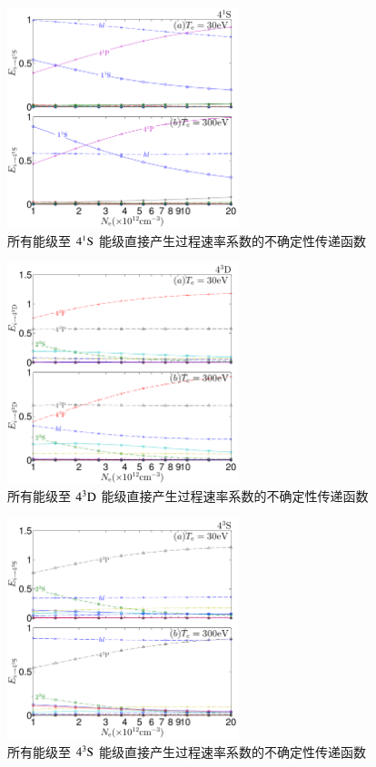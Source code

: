 \begin{figure}[H]
    \centering
    \includegraphics[width=0.6\textwidth]{41S-error-propagation-coefficient.pdf}
    \caption{所有能级至 $4^1{\rm S}$ 能级直接产生过程速率系数的不确定性传递函数}
    \label{fig:appendix:error-prop:3}
\end{figure}

\begin{figure}[H]
    \centering
    \includegraphics[width=0.6\textwidth]{43D-error-propagation-coefficient.pdf}
    \caption{所有能级至 $4^3{\rm D}$ 能级直接产生过程速率系数的不确定性传递函数}
    \label{fig:appendix:error-prop:4}
\end{figure}

\begin{figure}[H]
    \centering
    \includegraphics[width=0.6\textwidth]{43S-error-propagation-coefficient.pdf}
    \caption{所有能级至 $4^3{\rm S}$ 能级直接产生过程速率系数的不确定性传递函数}
    \label{fig:appendix:error-prop:5}
\end{figure}

